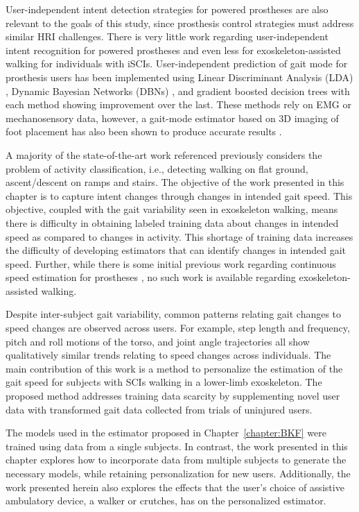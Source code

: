 User-independent intent detection strategies for powered prostheses are also relevant to the goals of this study, since prosthesis control strategies must address similar HRI challenges. There is very little work regarding user-independent intent recognition for powered prostheses and even less for exoskeleton-assisted walking for individuals with iSCIs. User-independent prediction of gait mode for prosthesis users has been implemented using Linear Discriminant Analysis (LDA) \cite{young2013classifying}, Dynamic Bayesian Networks (DBNs) \cite{young2015classification}, and gradient boosted decision trees \cite{bhakta2020machine} with each method showing improvement over the last. These methods rely on EMG or mechanosensory data, however, a gait-mode estimator based on 3D imaging of foot placement has also been shown to produce accurate results \cite{massalin2017user}. 

A majority of the state-of-the-art work referenced previously considers the problem of activity classification, i.e., detecting walking on flat ground, ascent/descent on ramps and stairs. The objective of the work presented in this chapter is to capture intent changes through changes in intended gait speed. This objective, coupled with the gait variability seen in exoskeleton walking, means there is difficulty in obtaining labeled training data about changes in intended speed as compared to changes in activity. This shortage of training data increases the difficulty of developing estimators that can identify changes in intended gait speed. Further, while there is some initial previous work regarding continuous speed estimation for prostheses \cite{best2021phase}, no such work is available regarding exoskeleton-assisted walking.

Despite inter-subject gait variability, common patterns relating gait changes to speed changes are observed across users. For example, step length and frequency, pitch and roll motions of the torso, and joint angle trajectories all show qualitatively similar trends relating to speed changes across individuals. The main contribution of this work is a method to personalize the estimation of the gait speed for subjects with SCIs walking in a lower-limb exoskeleton. The proposed method addresses training data scarcity by supplementing novel user data with transformed gait data collected from trials of uninjured users. 

The models used in the estimator proposed in Chapter~\ref{chapter:BKF} were trained using data from a single subjects. In contrast, the work presented in this chapter explores how to incorporate data from multiple subjects to generate the necessary models, while retaining personalization for new users. Additionally, the work presented herein also explores the effects that the user's choice of assistive ambulatory device, a walker or crutches, has on the personalized estimator.

